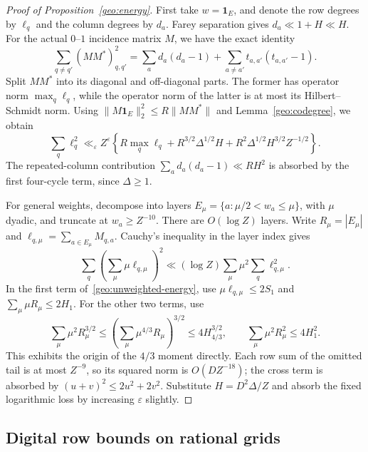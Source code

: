 \documentclass[11pt,a4paper]{article}
\theoremstyle{paperplain}
\numberwithin{equation}{section}
\begin{document}
\begin{proof}[Proof of Proposition~\ref{geo:energy}]
First take $w=\mathbf1_E$, and denote the row degrees by $\ell_q$ and the column
degrees by $d_a$. Farey separation gives $d_a\ll1+H\ll H$.
For the actual $0$--$1$ incidence matrix $M$, we have the exact identity
\begin{equation}\label{geo:trace-identity}
 \sum_{q\ne q'}(MM^*)_{q,q'}^2
 =\sum_a d_a(d_a-1)
  +\sum_{a\ne a'}t_{a,a'}(t_{a,a'}-1).
\end{equation}
Split $MM^*$ into its diagonal and off-diagonal parts. The former has operator
norm $\max_q\ell_q$, while the operator norm of the latter is at most its
Hilbert--Schmidt norm. Using
$\|M\mathbf1_E\|_2^2\le R\|MM^*\|$ and Lemma~\ref{geo:codegree}, we obtain
\begin{equation}\label{geo:unweighted-energy}
 \sum_q\ell_q^2\ll_\varepsilon Z^\varepsilon
 \left\{R\max_q\ell_q+R^{3/2}\Delta^{1/2}H
             +R^2\Delta^{1/2}H^{3/2}Z^{-1/2}\right\}.
\end{equation}
The repeated-column contribution
$\sum_a d_a(d_a-1)\ll RH^2$ is absorbed by the first four-cycle term,
since $\Delta\ge1$.

For general weights, decompose into layers
$E_\mu=\{a:\mu/2<w_a\le\mu\}$, with $\mu$ dyadic, and truncate at
$w_a\ge Z^{-10}$. There are $O(\log Z)$ layers. Write
$R_\mu=|E_\mu|$ and $\ell_{q,\mu}=\sum_{a\in E_\mu}M_{q,a}$.
Cauchy's inequality in the layer index gives
\[
 \sum_q\left(\sum_\mu\mu\ell_{q,\mu}\right)^2
 \ll(\log Z)\sum_\mu\mu^2\sum_q\ell_{q,\mu}^2.
\]
In the first term of~\eqref{geo:unweighted-energy}, use
$\mu\ell_{q,\mu}\le2S_1$ and
$\sum_\mu\mu R_\mu\le2H_1$. For the other two terms, use
\[
 \sum_\mu\mu^2R_\mu^{3/2}
 \le\left(\sum_\mu\mu^{4/3}R_\mu\right)^{3/2}
 \le4H_{4/3}^{3/2},\qquad
 \sum_\mu\mu^2R_\mu^2\le4H_1^2.
\]
This exhibits the origin of the $4/3$ moment directly.
Each row sum of the omitted tail is at most $Z^{-9}$, so its squared norm is
$O(DZ^{-18})$; the cross term is absorbed by $(u+v)^2\le2u^2+2v^2$.
Substitute $H=D^2\Delta/Z$ and absorb the fixed logarithmic loss by increasing
$\varepsilon$ slightly.
\end{proof}

\subsection{Digital row bounds on rational grids}
\end{document}

